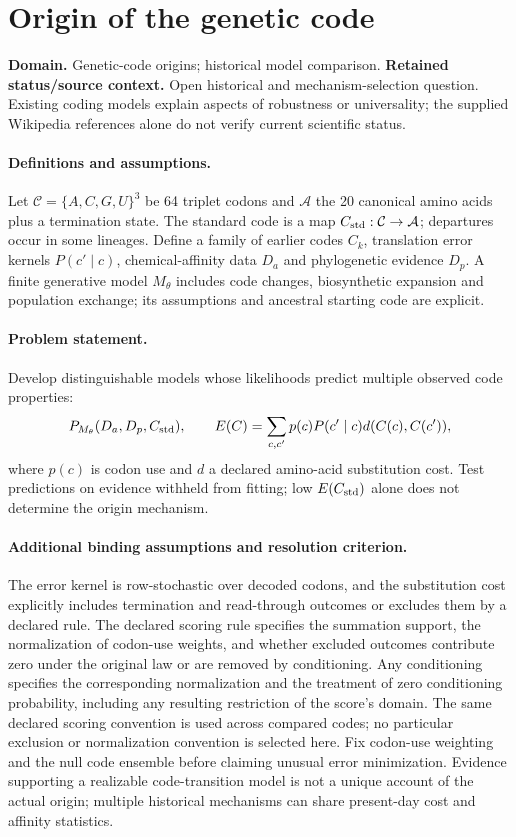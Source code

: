 \documentclass[11pt]{article}
\begin{document}
\section*{Origin of the genetic code}
\label{prob:288}
\label{rank:15}
\par\smallskip

\noindent\textbf{Domain.} Genetic-code origins; historical model comparison. \quad \textbf{Retained status/source context.} Open historical and mechanism-selection question. Existing coding models explain aspects of robustness or universality; the supplied Wikipedia references alone do not verify current scientific status.

\paragraph{Definitions and assumptions.} Let $\mathcal C=\{A,C,G,U\}^3$ be 64 triplet codons and $\mathcal A$ the 20 canonical amino acids plus a termination state. The standard code is a map $C_{\rm std}:\mathcal C\to\mathcal A$; departures occur in some lineages. Define a family of earlier codes $C_k$, translation error kernels $P(c'\mid c)$, chemical-affinity data $D_a$ and phylogenetic evidence $D_p$. A finite generative model $M_\theta$ includes code changes, biosynthetic expansion and population exchange; its assumptions and ancestral starting code are explicit.

\paragraph{Problem statement.} Develop distinguishable models whose likelihoods predict multiple observed code properties:
\[
P_{M_\theta}(D_a,D_p,C_{\rm std}),\qquad
E(C)=\sum_{c,c'}p(c)P(c'\mid c)d(C(c),C(c')),
\]
where $p(c)$ is codon use and $d$ a declared amino-acid substitution cost. Test predictions on evidence withheld from fitting; low $E(C_{\rm std})$ alone does not determine the origin mechanism.

\paragraph{Additional binding assumptions and resolution criterion.} The error kernel is row-stochastic over decoded codons, and the substitution cost explicitly includes termination and read-through outcomes or excludes them by a declared rule. The declared scoring rule specifies the summation support, the normalization of codon-use weights, and whether excluded outcomes contribute zero under the original law or are removed by conditioning. Any conditioning specifies the corresponding normalization and the treatment of zero conditioning probability, including any resulting restriction of the score's domain. The same declared scoring convention is used across compared codes; no particular exclusion or normalization convention is selected here. Fix codon-use weighting and the null code ensemble before claiming unusual error minimization. Evidence supporting a realizable code-transition model is not a unique account of the actual origin; multiple historical mechanisms can share present-day cost and affinity statistics.
\end{document}

